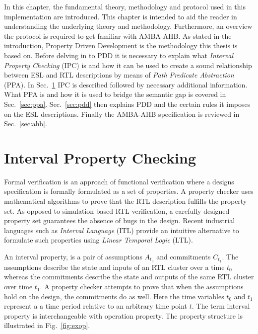 \label{ch:theory}

In this chapter, the fundamental theory, methodology and protocol used in this implementation are introduced. This chapter is intended to aid the reader in understanding the underlying theory and methodology. Furthermore, an overview the protocol is required to get familiar with AMBA-AHB. As stated in the introduction, Property Driven Development is the methodology this thesis is based on. Before delving in to PDD it is necessary to explain what \textit{Interval Property Checking} (IPC) is and how it can be used to create a sound relationship between ESL and RTL descriptions by means of \textit{Path Predicate Abstraction} (PPA). In Sec.~\ref{sec:ipc} IPC is described followed by necessary additional information. What PPA is and how it is used to bridge the semantic gap is covered in Sec.~\ref{sec:ppa}. Sec.~\ref{sec:pdd} then explains PDD and the certain rules it imposes on the ESL descriptions. Finally the AMBA-AHB specification is reviewed in Sec.~\ref{sec:ahb}.       


\section{Interval Property Checking}
\label{sec:ipc}
Formal verification is an approach of functional verification where a designs specification is formally formulated as a set of properties. A property checker uses mathematical algorithms to prove that the RTL description fulfills the property set. As opposed to simulation based RTL verification, a carefully designed property set guarantees the absence of bugs in the design. Recent industrial languages such as \textit{Interval Language} (ITL) provide an intuitive alternative to formulate such properties using \textit{Linear Temporal Logic} (LTL). \par
An interval property, is a pair of assumptions $A_{t_0}$ and commitments $C_{t_1}$. The assumptions describe the state and inputs of an RTL cluster over a time $t_0$ whereas the commitments describe the state and outputs of the same RTL cluster over time $t_1$. A property checker attempts to prove that when the assumptions hold on the design, the commitments do as well. Here the time variables $t_0$ and $t_1$ represent a a time period relative to an arbitrary time point $t$. The term interval property is interchangeable with operation property. The property structure is illustrated in Fig.~\ref{fig:exop}.  

